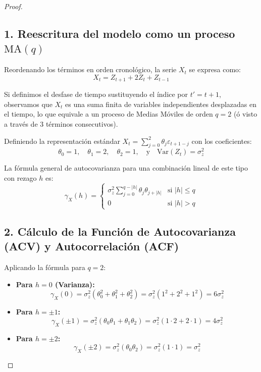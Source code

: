 \documentclass[11pt,letterpaper]{article}
\begin{document}
\begin{proof}

\subsection*{1. Reescritura del modelo como un proceso $\text{MA}(q)$}

Reordenando los términos en orden cronológico, la serie $X_t$ se expresa como:
\[
X_t = Z_{t+1} + 2 Z_t + Z_{t-1}
\]

Si definimos el desfase de tiempo sustituyendo el índice por $t' = t + 1$, observamos que $X_t$ es una suma finita de variables independientes desplazadas en el tiempo, lo que equivale a un proceso de Medias Móviles de orden $q = 2$ (ó visto a través de $3$ términos consecutivos).

Definiendo la representación estándar $X_t = \sum_{j=0}^{2} \theta_j \varepsilon_{t+1-j}$ con los coeficientes:
\[
\theta_0 = 1, \quad \theta_1 = 2, \quad \theta_2 = 1, \quad \text{y} \quad \text{Var}(Z_t) = \sigma_z^2
\]

La fórmula general de autocovarianza para una combinación lineal de este tipo con rezago $h$ es:
\[
\gamma_X(h) = 
\begin{cases} 
\sigma_z^2 \displaystyle\sum_{j=0}^{q - |h|} \theta_j \theta_{j+|h|} & \text{si } |h| \le q \\ 
0 & \text{si } |h| > q 
\end{cases}
\]

\subsection*{2. Cálculo de la Función de Autocovarianza (ACV) y Autocorrelación (ACF)}

Aplicando la fórmula para $q = 2$:

\begin{itemize}
    \item \textbf{Para $h = 0$ (Varianza):}
    \[
    \gamma_X(0) = \sigma_z^2 (\theta_0^2 + \theta_1^2 + \theta_2^2) = \sigma_z^2 (1^2 + 2^2 + 1^2) = 6 \sigma_z^2
    \]

    \item \textbf{Para $h = \pm 1$:}
    \[
    \gamma_X(\pm 1) = \sigma_z^2 (\theta_0 \theta_1 + \theta_1 \theta_2) = \sigma_z^2 (1 \cdot 2 + 2 \cdot 1) = 4 \sigma_z^2
    \]

    \item \textbf{Para $h = \pm 2$:}
    \[
    \gamma_X(\pm 2) = \sigma_z^2 (\theta_0 \theta_2) = \sigma_z^2 (1 \cdot 1) = \sigma_z^2
    \]


\end{itemize}
\end{proof}
\end{document}
